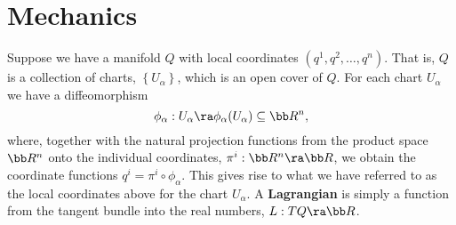 
\section{Mechanics}

Suppose we have a manifold $Q$ with local coordinates $(q^1,q^2,\ldots,q^n)$.
That is, $Q$ is a collection of charts, $\left\{ U_\alpha \right\}$, which is an
open cover of $Q$.  For each chart $U_\alpha$ we have a diffeomorphism
\begin{equation*} 
    \phi_\alpha:U_\alpha \ra \phi_\alpha(U_\alpha) \subseteq \bb
    R^n, 
\end{equation*} 
where, together with the natural projection functions
    from the product space $\bb R^n$ onto the individual coordinates, $\pi^i
    :\bb R^n \ra \bb R$,  we obtain the coordinate functions $q^i = \pi^i \circ
    \phi_\alpha$.  This gives rise to what we have referred to as the local
    coordinates above for the chart $U_\alpha$.  A \textbf{Lagrangian} is simply
    a function from the tangent bundle into the real numbers, $L:TQ \ra \bb R$.

